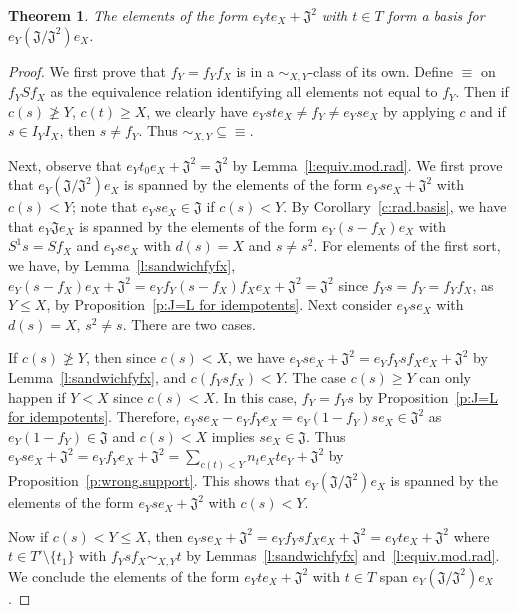 \documentclass[reqno,11pt]{amsart}
\newtheorem{Thm}{Theorem}[section]
\numberwithin{equation}{section}
\begin{document}
\begin{Thm}
    The elements of the form $e_Yte_X +\mathfrak J^2$ with $t\in T$ form a basis for $e_Y(\mathfrak J/\mathfrak J^2)e_X$.
\end{Thm}
\begin{proof}
We first prove that $f_Y=f_Yf_X$ is in a $\sim_{X,Y}$-class of its own.  Define $\equiv$ on $f_YSf_X$ as the equivalence relation identifying all elements not equal to $f_Y$.  Then if $c(s)\ngeq Y$, $c(t)\geq X$, we clearly have $e_Yste_X\neq f_Y\neq e_Yse_X$ by applying $c$ and if $s\in I_YI_X$, then $s\neq f_Y$.  Thus ${\sim_{X,Y}}\subseteq {\equiv}$.

Next, observe that $e_Yt_0e_X+\mathfrak J^2=\mathfrak J^2$ by Lemma~\ref{l:equiv.mod.rad}.  We first prove that $e_Y(\mathfrak J/\mathfrak J^2)e_X$ is spanned by the elements of the form $e_Yse_X+\mathfrak J^2$ with $c(s)<Y$; note that $e_Yse_X\in \mathfrak J$ if $c(s)<Y$.  By Corollary~\ref{c:rad.basis}, we have that $e_Y\mathfrak Je_X$ is spanned by the elements of the form $e_Y(s-f_X)e_X$ with $S^1s=Sf_X$ and $e_Yse_X$ with $d(s)=X$ and $s\neq s^2$.   For elements of the first sort, we have, by Lemma~\ref{l:sandwichfyfx},  $e_Y(s-f_X)e_X+\mathfrak J^2 = e_Yf_Y(s-f_X)f_Xe_X+\mathfrak J^2 =\mathfrak J^2$ since $f_Ys=f_Y=f_Yf_X$, as $Y\leq X$, by Proposition~\ref{p:J=L for idempotents}.    Next consider $e_Yse_X$ with $d(s)=X$, $s^2\neq s$.  There are two cases.  

If $c(s)\ngeq Y$, then since $c(s)<X$, we have $e_Yse_X+\mathfrak J^2 = e_Yf_Ysf_Xe_X+\mathfrak J^2$ by Lemma~\ref{l:sandwichfyfx}, and $c(f_Ysf_X)<Y$.  The case $c(s)\geq Y$ can only happen  if $Y<X$ since $c(s)<X$. In this case, $f_Y=f_Ys$ by Proposition~\ref{p:J=L for idempotents}.  Therefore, $e_Yse_X - e_Yf_Ye_X = e_Y(1-f_Y)se_X\in \mathfrak J^2$ as $e_Y(1-f_Y)\in \mathfrak J$ and $c(s)<X$ implies $se_X\in \mathfrak J$. Thus $e_Yse_X+\mathfrak J^2 = e_Yf_Ye_X+\mathfrak J^2 = \sum_{c(t)<Y}n_te_Xte_Y+\mathfrak J^2$ by Proposition~\ref{p:wrong.support}. This shows that $e_Y(\mathfrak J/\mathfrak J^2)e_X$ is spanned by the elements of the form $e_Yse_X+\mathfrak J^2$ with $c(s)<Y$.

Now if $c(s)<Y\leq X$, then $e_Yse_X+\mathfrak J^2 = e_Yf_Ysf_Xe_X+\mathfrak J^2 = e_Yte_X+\mathfrak J^2$ where $t\in T'\setminus \{t_1\}$ with $f_Ysf_X\sim_{X,Y} t$ by Lemmas~\ref{l:sandwichfyfx} and~\ref{l:equiv.mod.rad}.
We conclude the elements of the form $e_Yte_X+\mathfrak J^2$ with $t\in T$ span $e_Y(\mathfrak J/\mathfrak J^2)e_X$.


\end{proof}
\end{document}
